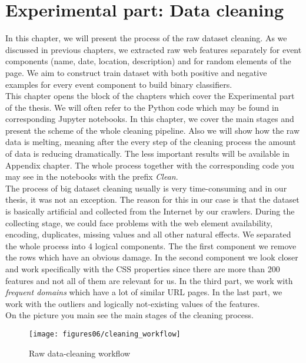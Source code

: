 \chapter{Experimental part: Data cleaning}
\label{chap:clean}
In this chapter, we will present the process of the raw dataset cleaning. As we discussed in previous chapters, we extracted raw web features separately for event components (name, date, location, description) and for random elements of the page. We aim to construct train dataset with both positive and negative examples for every event component to build binary classifiers. \\

This chapter opens the block of the chapters which cover the Experimental part of the thesis. We will often refer to the Python code which may be found in corresponding Jupyter notebooks. In this chapter, we cover the main stages and present the scheme of the whole cleaning pipeline. Also we will show how the raw data is melting, meaning after the every step of the cleaning process the amount of data is reducing dramatically. The less important results will be available in Appendix chapter. The whole process together with the corresponding code you may see in the notebooks with the prefix \textit{Clean}.\\

The process of big dataset cleaning usually is very time-consuming and in our thesis, it was not an exception. The reason for this in our case is that the dataset is basically artificial and collected from the Internet by our crawlers. During the collecting stage, we could face problems with the web element availability, encoding, duplicates, missing values and all other natural effects. We separated the whole process into 4 logical components. The the first component we remove the rows which have an obvious damage. In the second component we look closer and work specifically with the CSS properties since there are more than 200 features and not all of them are relevant for us. In the third part, we work with \textit{frequent domains} which have a lot of similar URL pages. In the last part, we work with the outliers and logically not-existing values of the features. \\

On the picture  you main see the main stages of the cleaning process.



\begin{figure}[h]
\begin{center}
\texttt{[image: figures06/cleaning\_workflow]}
\caption{Raw data-cleaning workflow}
\label{fig:clean}
\end{center}
\end{figure}

